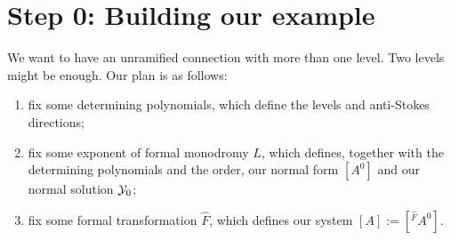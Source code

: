 \section{Step 0: Building our example}
We want to have an unramified connection with more than one level. Two levels
might be enough. Our plan is as follows:
\begin{enumerate}
  \item fix some determining polynomials, which define the levels and
    anti-Stokes directions;
  \item fix some exponent of formal monodromy $L$, which defines, together with
    the determining polynomials and the order, our normal form $[A^0]$ and our
    normal solution $\mathcal{Y}_0$;
  \item fix some formal transformation $\hat F$, which defines our system
    $[A]:=[{}^{\hat F}\!A^0]$.
\end{enumerate}

